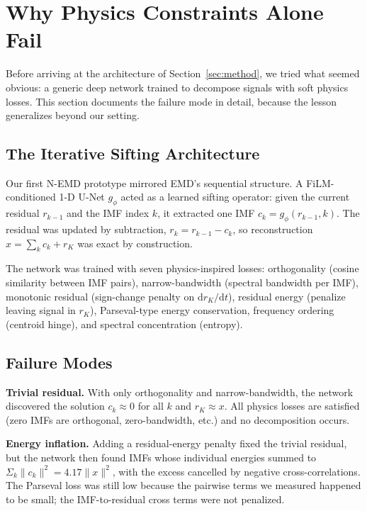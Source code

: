 \documentclass[journal]{IEEEtran}
\begin{document}
\section{Why Physics Constraints Alone Fail}
\label{sec:negative-result}

Before arriving at the architecture of Section~\ref{sec:method}, we tried what seemed obvious: a generic deep network trained to decompose signals with soft physics losses. This section documents the failure mode in detail, because the lesson generalizes beyond our setting.

\subsection{The Iterative Sifting Architecture}

Our first N-EMD prototype mirrored EMD's sequential structure. A FiLM-conditioned 1-D U-Net $g_{\phi}$ acted as a learned sifting operator: given the current residual $r_{k-1}$ and the IMF index $k$, it extracted one IMF $c_{k} = g_{\phi}(r_{k-1}, k)$. The residual was updated by subtraction, $r_{k} = r_{k-1} - c_{k}$, so reconstruction $x = \sum_{k} c_{k} + r_{K}$ was exact by construction.

The network was trained with seven physics-inspired losses: orthogonality (cosine similarity between IMF pairs), narrow-bandwidth (spectral bandwidth per IMF), monotonic residual (sign-change penalty on $\mathrm{d}r_{K}/\mathrm{d}t$), residual energy (penalize leaving signal in $r_{K}$), Parseval-type energy conservation, frequency ordering (centroid hinge), and spectral concentration (entropy).

\subsection{Failure Modes}

\textbf{Trivial residual.} With only orthogonality and narrow-bandwidth, the network discovered the solution $c_{k} \approx 0$ for all $k$ and $r_{K} \approx x$. All physics losses are satisfied (zero IMFs are orthogonal, zero-bandwidth, etc.) and no decomposition occurs.

\textbf{Energy inflation.} Adding a residual-energy penalty fixed the trivial residual, but the network then found IMFs whose individual energies summed to $\Sigma_{k} \|c_{k}\|^{2} = 4.17 \|x\|^{2}$, with the excess cancelled by negative cross-correlations. The Parseval loss was still low because the pairwise terms we measured happened to be small; the IMF-to-residual cross terms were not penalized.
\end{document}
